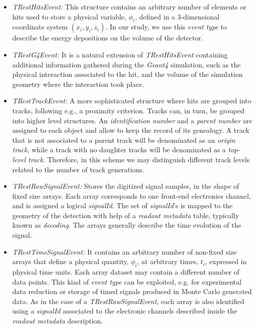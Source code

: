 \begin{itemize}
\item \emph{TRestHitsEvent:} This structure contains an arbitrary number of elements or hits used to store a physical variable, $\phi_i$, defined in a 3-dimensional coordinate system $(x_i, y_i, z_i)$. In our study, we use this \emph{event type} to describe the energy depositions on the volume of the detector.
\item \emph{TRestG4Event:} It is a natural extension of \emph{TRestHitsEvent} containing additional information gathered during the \emph{Geant4} simulation, such as the physical interaction associated to the hit, and the volume of the simulation geometry where the interaction took place.
\item \emph{TRestTrackEvent:} A more sophisticated structure where hits are grouped into tracks, following e.g., a proximity criterion. Tracks can, in turn, be grouped into higher level structures. An \emph{identification number} and a \emph{parent number} are assigned to each object and allow to keep the record of its genealogy. A track that is not associated to a parent track will be denominated as an \emph{origin track}, while a track with no daughter tracks will be denominated as a \emph{top-level track}. Therefore, in this scheme we may distinguish different track levels related to the number of track generations.

\item \emph{TRestRawSignalEvent:} Stores the digitized signal samples, in the shape of fixed size arrays. Each array corresponds to one front-end electronics channel, and is assigned a logical \emph{signalId}. The set of \emph{signalId}'s is mapped to the geometry of the detection with help of a \emph{readout metadata} table, typically known as \emph{decoding}. The arrays generally describe the time evolution of the signal.
\item \emph{TRestTimeSignalEvent:} It contains an arbitrary number of non-fixed size arrays that define a physical quantity, $\phi_i$, at arbitrary times, $t_i$, expressed in physical time units. Each array dataset may contain a different number of data points. This kind of \emph{event type} can be exploited, e.g. for experimental data reduction or storage of timed signals produced in Monte Carlo generated data. As in the case of a \emph{TRestRawSignalEvent}, each array is also identified using a \emph{signalId} associated to the electronic channels described inside the \emph{readout metadata} description.

\end{itemize}

